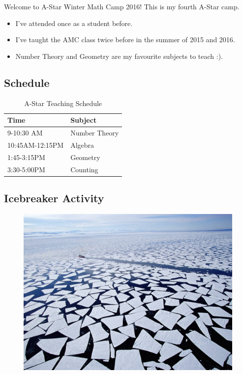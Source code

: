 Welcome to A-Star Winter Math Camp 2016!  This is my fourth A-Star camp.  
\begin{itemize}
	\item  I've attended once as a student before.
	\item  I've taught the AMC class twice before in the summer of 2015 and 2016.
	\item Number Theory and Geometry are my favourite subjects to teach :).   
\end{itemize}


\clearpage


\subsection{Schedule}

\begin{table}[h]
	\centering
	\begin{tabular}{l l}
		\toprule
		\textbf{Time} & \textbf{Subject} \\
		\midrule
		9-10:30 AM & Number Theory \\
		10:45AM-12:15PM & Algebra \\ 
		1:45-3:15PM & Geometry \\
		3:30-5:00PM & Counting \\
		\bottomrule
	\end{tabular}
	\caption{A-Star Teaching Schedule}
\end{table}

\clearpage 
\subsection{Icebreaker Activity}

\begin{figure}[h]
	\centering\includegraphics[width=0.5\linewidth]{images/icebreaker.jpg}
\end{figure}

